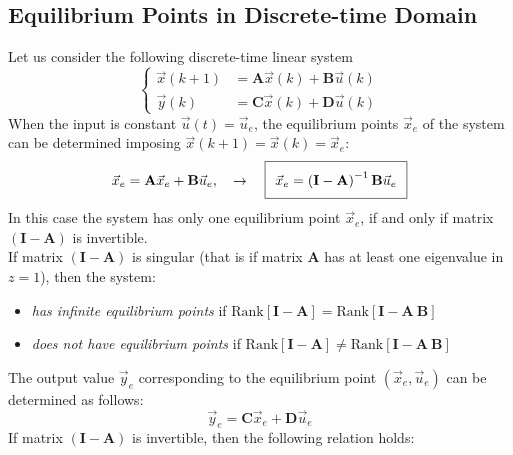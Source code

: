 \documentclass[11pt,a4paper,oneside]{book}
\numberwithin{equation}{section}
\theoremstyle{it}
\theoremstyle{definition}
\begin{document}
\subsection{Equilibrium Points in Discrete-time Domain} 
Let us consider the following discrete-time linear system
\begin{equation}\label{eq73}
	\left\lbrace 
	\begin{aligned}
		\vec{x}(k+1) &= \mathbf{A}\vec{x}(k)+\mathbf{B}\vec{u}(k) \\[6pt]
		\vec{y}(k) &= \mathbf{C}\vec{x}(k)+\mathbf{D}\vec{u}(k)
	\end{aligned}
	\right. 
\end{equation}
When the input is constant $\vec{u}(t) = \vec{u}_e$, the equilibrium points 
$\vec{x}_e$ of the system can be determined imposing $\vec{x}(k+1)=\vec{x}(k) = 
\vec{x}_e$:
\begin{equation}\label{eq74} 
	\setlength\fboxsep{0.25cm}
	\setlength\fboxrule{0.4pt}
	\begin{aligned}
		\vec{x}_e = \mathbf{A}\vec{x}_e + {\mathbf{B}}\vec{u}_e, \quad 
		\rightarrow \quad
		\boxed{ \vec{x}_e=\left( \mathbf{I}-{\mathbf{A}}\right) ^{-1} 
		{\mathbf{B}}\vec{u}_e }
	\end{aligned}
\end{equation}
In this case the system has only one equilibrium point $\vec{x}_e$, if and only 
if matrix $\left(\mathbf{I}-\mathbf{A}\right)$ is invertible. \\
If matrix $\left(\mathbf{I}-\mathbf{A}\right)$ is singular (that is if matrix 
$\mathbf{A}$ has at least one eigenvalue in $z = 1$), then the system:
\begin{itemize}
	\item \textit{has infinite equilibrium points} if 
	$\text{Rank}\left[\mathbf{I}-\mathbf{A} \right] 
	=\text{Rank}\left[\mathbf{I}-\mathbf{A} \ \mathbf{B}\right]$
	\item \textit{does not have equilibrium points} if 
	$\text{Rank}\left[\mathbf{I}-\mathbf{A} \right] \ne 
	\text{Rank}\left[\mathbf{I}-\mathbf{A} \ \mathbf{B}\right]$
\end{itemize}
The output value $\vec{y}_e$ corresponding to the equilibrium point $\left( 
\vec{x}_e, \vec{u}_e \right)$ can be determined as follows:
\begin{equation}\label{eq75} 
	\vec{y}_e = \mathbf{C}\vec{x}_e+\mathbf{D}\vec{u}_e
\end{equation}
If matrix $\left(\mathbf{I}-\mathbf{A}\right)$ is invertible, then the 
following relation holds:
\end{document}
